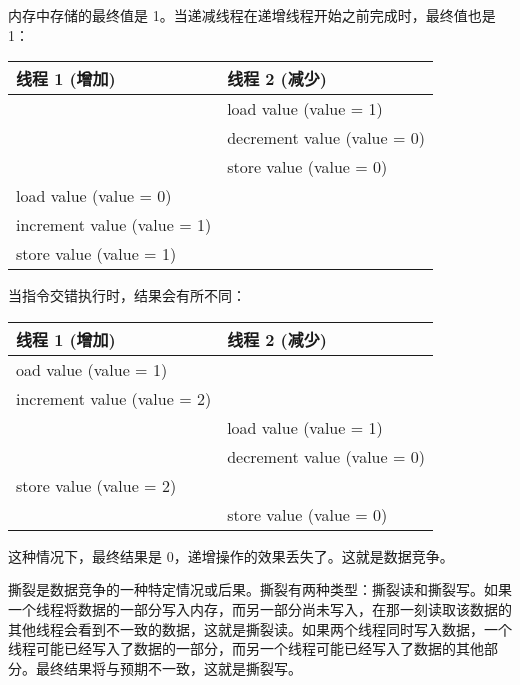 内存中存储的最终值是 1。当递减线程在递增线程开始之前完成时，最终值也是 1：

\begin{longtable}{|l|l|}
\hline
\textbf{线程 1 (增加)} & \textbf{线程 2 (减少)} \\ \hline
\endfirsthead
%
\endhead
%
& load value (value = 1)        \\ \hline
& decrement value (value = 0)   \\ \hline
& store value (value = 0)       \\ \hline
load value (value = 0)        &                               \\ \hline
increment value (value = 1)   &                               \\ \hline
store value (value = 1)       &                               \\ \hline
\end{longtable}

当指令交错执行时，结果会有所不同：

\begin{longtable}{|l|l|}
\hline
\textbf{线程 1 (增加)} & \textbf{线程 2 (减少)} \\ \hline
\endfirsthead
%
\endhead
%
oad value (value = 1)         &                               \\ \hline
increment value (value = 2)   &                               \\ \hline
& load value (value = 1)        \\ \hline
& decrement value (value = 0)   \\ \hline
store value (value = 2)       &                               \\ \hline
& store value (value = 0)       \\ \hline
\end{longtable}

这种情况下，最终结果是 0，递增操作的效果丢失了。这就是数据竞争。


撕裂是数据竞争的一种特定情况或后果。撕裂有两种类型：撕裂读和撕裂写。如果一个线程将数据的一部分写入内存，而另一部分尚未写入，在那一刻读取该数据的其他线程会看到不一致的数据，这就是撕裂读。如果两个线程同时写入数据，一个线程可能已经写入了数据的一部分，而另一个线程可能已经写入了数据的其他部分。最终结果将与预期不一致，这就是撕裂写。

